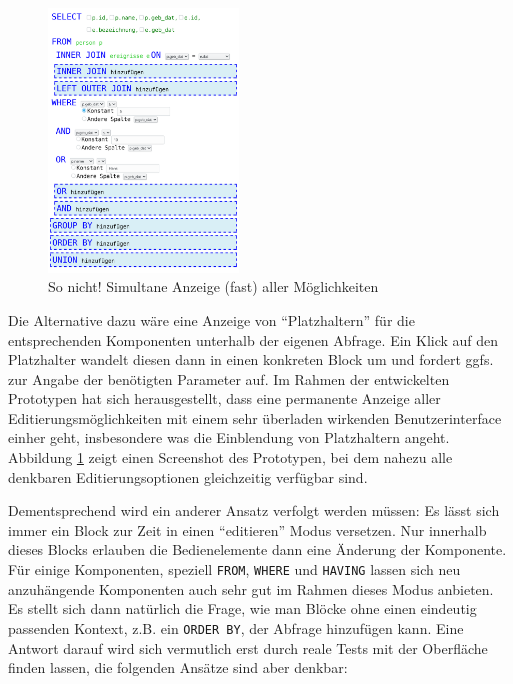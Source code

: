 \begin{figure}
  \includegraphics[width=0.45\textwidth]{images/sql-sketch-all-editing}
  \caption{So nicht! Simultane Anzeige (fast) aller Möglichkeiten}
  \label{fig:screen-sql-editor-all-editing}
\end{figure}

Die Alternative dazu wäre eine Anzeige von ``Platzhaltern'' für die entsprechenden Komponenten unterhalb der eigenen Abfrage. Ein Klick auf den Platzhalter wandelt diesen dann in einen konkreten Block um und fordert ggfs. zur Angabe der benötigten Parameter auf. Im Rahmen der entwickelten Prototypen hat sich herausgestellt, dass eine permanente Anzeige aller Editierungsmöglichkeiten mit einem sehr überladen wirkenden Benutzerinterface einher geht, insbesondere was die Einblendung von Platzhaltern angeht. Abbildung \ref{fig:screen-sql-editor-all-editing} zeigt einen Screenshot des Prototypen, bei dem nahezu alle denkbaren Editierungsoptionen gleichzeitig verfügbar sind.

Dementsprechend wird ein anderer Ansatz verfolgt werden müssen: Es lässt sich immer ein Block zur Zeit in einen ``editieren'' Modus versetzen. Nur innerhalb dieses Blocks erlauben die Bedienelemente dann eine Änderung der Komponente. Für einige Komponenten, speziell \texttt{FROM}, \texttt{WHERE} und \texttt{HAVING} lassen sich neu anzuhängende Komponenten auch sehr gut im Rahmen dieses Modus anbieten. Es stellt sich dann natürlich die Frage, wie man Blöcke ohne einen eindeutig passenden Kontext, z.B. ein \texttt{ORDER BY}, der Abfrage hinzufügen kann. Eine Antwort darauf wird sich vermutlich erst durch reale Tests mit der Oberfläche finden lassen, die folgenden Ansätze sind aber denkbar:

